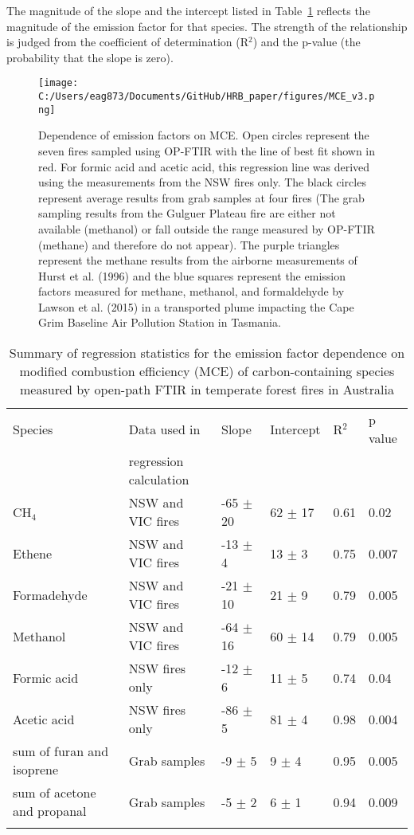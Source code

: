 \documentclass[acp, manuscript]{copernicus}
\begin{document}
The magnitude of the slope and the intercept listed in Table~\ref{table:MCE_dep} reflects the magnitude of the emission factor for that species. The strength of the relationship is judged from the coefficient of determination (R$^2$) and the p-value (the probability that the slope is zero). 

\begin{figure}
  \texttt{[image: C:/Users/eag873/Documents/GitHub/HRB\_paper/figures/MCE\_v3.png]}
  \caption{Dependence of emission factors on MCE. Open circles represent the seven fires sampled using OP-FTIR with the line of best fit shown in red. For formic acid and acetic acid, this regression line was derived using the measurements from the NSW fires only. The black circles represent average results from grab samples at four fires (The grab sampling results from the Gulguer Plateau fire are either not available (methanol) or fall outside the range measured by OP-FTIR (methane) and therefore do not appear). The purple triangles represent the methane results from the airborne measurements of Hurst et al. (1996) and the blue squares represent the emission factors measured for methane, methanol, and formaldehyde by Lawson et al. (2015) in a transported plume impacting the Cape Grim Baseline Air Pollution Station in Tasmania.
  }
  \label{fig:MCE_dep}
\end{figure}

\begin{table}
    \caption{Summary of regression statistics for the emission factor dependence on modified combustion efficiency (MCE) of carbon-containing species measured by open-path FTIR in temperate forest fires in Australia}
  \begin{tabular}{l l l l l l } 
    \tophline
   Species & Data used in &  Slope & Intercept & R$^2$ & p value \\
   & regression calculation &&& &\\
   \hline
  CH$_4$& NSW and VIC fires & -65 $\pm$ 20 & 62 $\pm$ 17 & 0.61& 0.02 \\ 
  Ethene & NSW and VIC fires& -13 $\pm$ 4 & 13 $\pm$ 3 & 0.75 & 0.007 \\
  Formadehyde & NSW and VIC fires& -21 $\pm$ 10& 21 $\pm$ 9& 0.79 & 0.005\\
  Methanol  & NSW and VIC fires& -64 $\pm$ 16 & 60 $\pm$ 14 & 0.79 & 0.005\\
  Formic acid  & NSW fires only & -12 $\pm$ 6& 11 $\pm$ 5 & 0.74 & 0.04\\ 
  Acetic acid  & NSW fires only & -86 $\pm$ 5 & 81 $\pm$ 4 & 0.98 & 0.004 \\ 
  sum of furan and isoprene & Grab samples & -9 $\pm$ 5 & 9 $\pm$ 4 & 0.95 & 0.005 \\ 
  sum of acetone and propanal & Grab samples & -5 $\pm$ 2& 6 $\pm$ 1& 0.94 & 0.009 \\ 
    \bottomhline
  \end{tabular}
  \label{table:MCE_dep}
  \belowtable{} %
\end{table}
\end{document}
